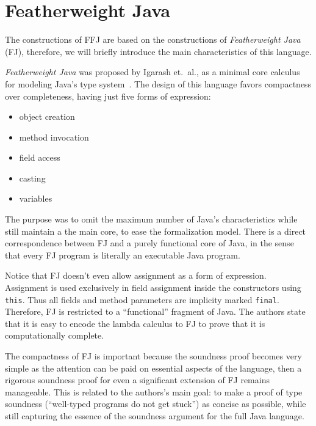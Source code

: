 \section{Featherweight Java}

The constructions of FFJ are based on the constructions of \textit{Featherweight
Java} (FJ), therefore, we will briefly introduce the main characteristics of
this language.

\textit{Featherweight Java} was proposed by Igarash et.\ al., as a minimal core
calculus for modeling Java's type system~\cite{Igarashi99featherweightjava}. The 
design of this language favors compactness over completeness, having just five 
forms of expression:
\begin{itemize}
    \item object creation
    \item method invocation
    \item field access
    \item casting 
    \item variables
\end{itemize}

The purpose was to omit the maximum number of Java's characteristics while still
maintain a the main core, to ease the formalization model.
There is a direct correspondence between FJ and a purely functional core of
Java, in the sense that every FJ program is literally an executable Java
program.

Notice that FJ doesn't even allow assignment as a form of expression.
Assignment is used exclusively in field assignment inside the  constructors
using \texttt{this}. Thus all fields and method parameters are implicity marked
\texttt{final}. Therefore, FJ is restricted to a ``functional'' fragment of
Java. The authors state that it is easy to encode the lambda calculus to FJ to
prove that it is computationally complete.

The compactness of FJ is important because the soundness proof becomes very
simple as the attention can be paid on essential aspects of the language, then
a rigorous soundness proof for even a significant extension of FJ remains
manageable. This is related to the authors's main goal: to make a proof of type
soundness (``well-typed programs do not get stuck'') as concise as possible, while
still capturing the essence of the soundness argument for the full Java language.

